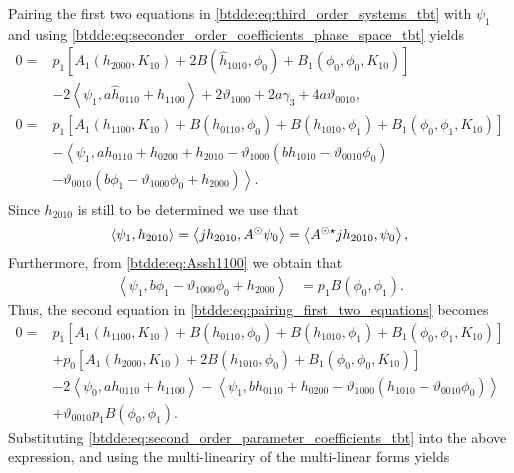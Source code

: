 Pairing the first two equations in \cref{btdde:eq:third_order_systems_tbt} with $\psi_1$ and using 
\cref{btdde:eq:seconder_order_coefficients_phase_space_tbt} yields
\begin{equation}
\label{btdde:eq:pairing_first_two_equations}
\begin{aligned}
0 ={}& p_1\left[A_1(h_{2000},K_{10})+ 2 B(\hat h_{1010},\phi_0) + B_1(\phi_0,\phi_0,K_{10})\right] \\
                         & -2\left<\psi_1,a \hat h_{0110} + h_{1100}\right> + 2\vartheta_{1000}
                            + 2a\gamma_3 + 4a \vartheta_{0010}, \\
0 ={}& p_1 \left[A_1(h_{1100},K_{10}) + B(h_{0110},\phi_0) + B(h_{1010},\phi_1) + B_1(\phi_0,\phi_1,K_{10})\right] \\
                         & -\left<\psi_1,ah_{0110} + h_{0200} + h_{2010} - \vartheta_{1000} (b h_{1010} - \vartheta_{0010} \phi_0) \right. \\
                         & \left. - \vartheta_{0010} (b \phi_1 - \vartheta_{1000} \phi_0 + h_{2000})  \right>. \\
\end{aligned}
\end{equation}
Since $h_{2010}$ is still to be determined we use that
\[
    \left< \psi_1, h_{2010} \right> 
    = \left< j h_{2010}, A^\odot \psi_0 \right> 
    = \left< A^{\odot\star} j h_{2010}, \psi_0 \right>,
\]
Furthermore, from \cref{btdde:eq:Assh1100} we obtain that
\begin{align}
    \label{btdde:eq:psi1_Assh1000}
    \left<\psi_1, b \phi_1 - \vartheta_{1000} \phi_0 + h_{2000}  \right> &{}= p_1 B(\phi_0,\phi_1).
\end{align}
Thus, the second equation in \cref{btdde:eq:pairing_first_two_equations} becomes
\begin{align*}
0 ={}& p_1 \left[A_1(h_{1100},K_{10}) + B(h_{0110},\phi_0) + B(h_{1010},\phi_1) + B_1(\phi_0,\phi_1,K_{10})\right] \\
     & + p_0 \left[A_1(h_{2000},K_{10})+ 2 B(h_{1010},\phi_0) + B_1(\phi_0,\phi_0,K_{10})\right] \\
     & -2\left<\psi_0, a h_{0110} + h_{1100}\right> -\left<\psi_1,bh_{0110} + h_{0200} - \vartheta_{1000} (h_{1010} - \vartheta_{0010} \phi_0)\right> \\
     & + \vartheta_{0010} p_1 B(\phi_0,\phi_1).
\end{align*}
Substituting \cref{btdde:eq:second_order_parameter_coefficients_tbt} into the above expression, and using the multi-lineariry of the multi-linear forms yields
